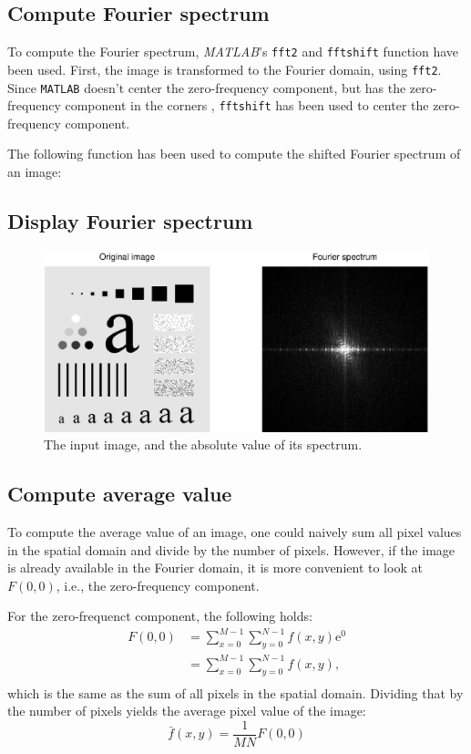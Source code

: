 \setcounter{subsection}{0}
\subsection{Compute Fourier spectrum}
To compute the Fourier spectrum, \textit{MATLAB}'s \texttt{fft2} and \texttt{fftshift} function have been used.
First, the image is transformed to the Fourier domain, using \texttt{fft2}.
Since \texttt{MATLAB} doesn't center the zero-frequency component, but has the zero-frequency component in the corners \cite{fftshift}, \texttt{fftshift} has been used to center the zero-frequency component.

The following function has been used to compute the shifted Fourier spectrum of an image:

\subsection{Display Fourier spectrum}
\begin{figure}[h]
 \centering
 \includegraphics{characters_spectrum.eps}
 \caption{The input image, and the absolute value of its spectrum.}
 \label{fig:characters_spectrum}
\end{figure}

\subsection{Compute average value}
To compute the average value of an image, one could naively sum all pixel values in the spatial domain and divide by the number of pixels.
However, if the image is already available in the Fourier domain, it is more convenient to look at \(F(0, 0)\), i.e., the zero-frequency component.

For the zero-frequenct component, the following holds:
\begin{equation} \label{zero_freq}
\begin{split}
F(0, 0) & = \sum_{x=0}^{M-1}\sum_{y=0}^{N-1}{f(x, y)\mathrm{e}^{0}} \\
 & = \sum_{x=0}^{M-1}\sum_{y=0}^{N-1}{f(x, y)}\text{,} \\
\end{split}
\end{equation}
which is the same as the sum of all pixels in the spatial domain.
Dividing that by the number of pixels yields the average pixel value of the image:
\[\bar{f}(x, y) = \frac{1}{MN}F(0, 0)\]
\clearpage
